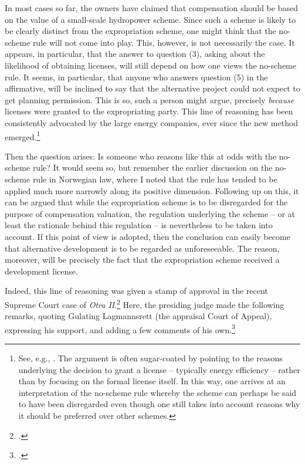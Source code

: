 In most cases so far, the owners have claimed that compensation should be based on the value of a small-scale hydropower scheme. Since such a scheme is likely to be clearly distinct from the expropriation scheme, one might think that the no-scheme rule will not come into play. This, however, is not necessarily the case. It appears, in particular, that the answer to question (3), asking about the likelihood of obtaining licenses, will still depend on how one views the no-scheme rule. It seems, in particular, that anyone who answers question (5) in the affirmative, will be inclined to say that the alternative project could not expect to get planning permission. This is so, such a person might argue, precisely \emph{because} licenses were granted to the expropriating party. This line of reasoning has been consistently advocated by the large energy companies, ever since the new method emerged.\footnote{See, e.g., \cite{klovtveit11,otra11,otra13}. The argument is often sugar-coated by pointing to the reasons underlying the decision to grant a license -- typically energy efficiency -- rather than by focusing on the formal license itself. In this way, one arrives at an interpretation of the no-scheme rule whereby the scheme can perhaps be said to have been disregarded even though one still takes into account reasons why it should be preferred over other schemes.}

Then the question arises: Is someone who reasons like this at odds with the no-scheme rule? It would seem so, but remember the earlier discussion on the no-scheme rule in Norwegian law, where I noted that the rule has tended to be applied much more narrowly along its positive dimension. Following up on this, it can be argued that while the expropriation scheme is to be disregarded for the purpose of compensation valuation, the regulation underlying the scheme -- or at least the rationale behind this regulation -- is nevertheless to be taken into account. If this point of view is adopted, then the conclusion can easily become that alternative development is to be regarded as unforeseeable. The reason, moreover, will be precisely the fact that the expropriation scheme received a development license. 

Indeed, this line of reasoning was given a stamp of approval in the recent Supreme Court case of \emph{Otra II}.\footcite{otra13} Here, the presiding judge made the following remarks, quoting Gulating Lagmannsrett (the appraisal Court of Appeal), expressing his support, and adding a few comments of his own.\footcite[]{otra13}

